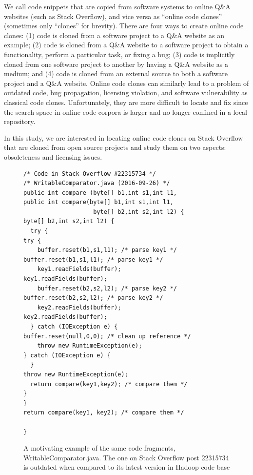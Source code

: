 \documentclass[sigconf,review, anonymous]{acmart}
\begin{document}

We call code snippets that are copied from software systems to online Q\&A websites (such as Stack Overflow), and vice versa as ``online code clones'' (sometimes only ``clones'' for brevity). There are four ways to create online code clones: (1) code is cloned from a software project to a Q\&A website as an example; (2) code is cloned from a Q\&A website to a software project to obtain a functionality, perform a particular task, or fixing a bug; (3) code is implicitly cloned from one software project to another by having a Q\&A website as a medium; and (4) code is cloned from an external source to both a software project and a Q\&A website. Online code clones can similarly lead to a problem of outdated code, bug propagation, licensing violation, and software vulnerability as classical code clones. Unfortunately, they are more difficult to locate and fix since the search space in online code corpora is larger and no longer confined in a local repository. 

In this study, we are interested in locating online code clones on Stack Overflow that are cloned from open source projects and study them on two aspects: obsoleteness and licensing issues. 

\begin{figure}
	\begin{lstlisting}
/* Code in Stack Overflow #22315734 */                    /* WritableComparator.java (2016-09-26) */
public int compare (byte[] b1,int s1,int l1,              public int compare(byte[] b1,int s1,int l1,
                    byte[] b2,int s2,int l2) {                               byte[] b2,int s2,int l2) {
  try {                                                     try {
    buffer.reset(b1,s1,l1); /* parse key1 */                  buffer.reset(b1,s1,l1); /* parse key1 */
    key1.readFields(buffer);                                  key1.readFields(buffer);
    buffer.reset(b2,s2,l2); /* parse key2 */                  buffer.reset(b2,s2,l2); /* parse key2 */
    key2.readFields(buffer);                                  key2.readFields(buffer);
  } catch (IOException e) {                                   buffer.reset(null,0,0); /* clean up reference */
    throw new RuntimeException(e);                          } catch (IOException e) {
  }                                                           throw new RuntimeException(e);
  return compare(key1,key2); /* compare them */             }
}                                                           return compare(key1, key2); /* compare them */
	                                                        }
	\end{lstlisting}
	\caption{A motivating example of the same code fragments, WritableComparator.java. The one on Stack Overflow post 22315734 is outdated when compared to its latest version in Hadoop code base}
	\label{fig:before-after}
\end{figure}
\end{document}
